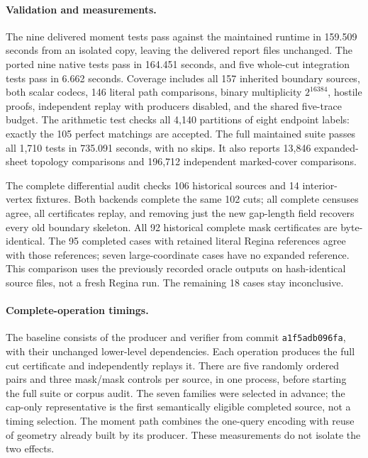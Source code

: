 \paragraph{Validation and measurements.}
The nine delivered moment tests pass against the maintained runtime in
159.509 seconds from an isolated copy, leaving the delivered report files
unchanged. The ported nine native tests pass in 164.451 seconds, and five
whole-cut integration tests pass in 6.662 seconds. Coverage includes all
157 inherited boundary sources, both scalar codecs, 146 literal path
comparisons, binary multiplicity $2^{16384}$, hostile proofs, independent
replay with producers disabled, and the shared five-trace budget.
The arithmetic test checks all 4,140 partitions of eight endpoint labels:
exactly the 105 perfect matchings are accepted.
The full maintained suite passes all 1,710 tests in 735.091 seconds, with
no skips. It also reports 13,846 expanded-sheet topology comparisons and
196,712 independent marked-cover comparisons.

The complete differential audit checks 106 historical sources and 14
interior-vertex fixtures. Both backends complete the same 102 cuts; all
complete censuses agree, all certificates replay, and removing just the new
gap-length field recovers every old boundary skeleton. All 92 historical
complete mask certificates are byte-identical. The 95 completed cases with
retained literal Regina references agree with those references; seven
large-coordinate cases have no expanded reference. This comparison uses
the previously recorded oracle outputs on hash-identical source files,
not a fresh Regina run. The remaining 18 cases stay inconclusive.

\paragraph{Complete-operation timings.}
The baseline consists of the producer and verifier from commit
\texttt{a1f5adb096fa}, with their unchanged lower-level dependencies.
Each operation produces the full cut certificate and independently replays
it. There are five randomly ordered pairs and three mask/mask controls per
source, in one process, before starting the full suite or corpus audit.
The seven families were selected in advance; the cap-only representative
is the first semantically eligible completed source, not a timing selection.
The moment path combines the one-query encoding with reuse of geometry
already built by its producer. These measurements do not isolate the two
effects.

